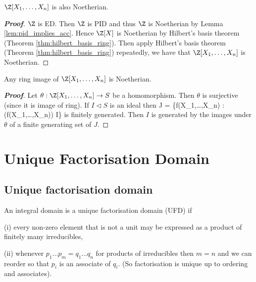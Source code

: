 \begin{corollary}
$\Z[X_1,\dots ,X_n]$ is also Noetherian.
\end{corollary}

\begin{proof}[\bf Proof]
$\Z$ is ED. Then $\Z$ is PID and thus $\Z$ is Noetherian by Lemma \ref{lem:pid_implies_acc}. Hence $\Z[X]$ is Noetherian by Hilbert's basis theorem (Theorem \ref{thm:hilbert_basis_ring}). Then apply Hilbert's basis theorem (Theorem \ref{thm:hilbert_basis_ring}) repeatedly, we have that $\Z[X_1,\dots ,X_n]$ is Noetherian.
\end{proof}

\begin{corollary}
Any ring image of $\Z[X_1,\dots ,X_n]$ is Noetherian.
\end{corollary}

\begin{proof}[\bf Proof]
Let $\theta : \Z[X_1,\dots ,X_n] \to S$ be a homomorphism. Then $\theta$ is surjective (since it is image of ring). If $I \lhd S$ is an ideal then
\be
J = \{f(X_1,\dots ,X_n) \in \Z[X_1,\dots ,X_n] : \theta(f(X_1,\dots ,X_n)) \in I\}
\ee
is finitely generated. Then $I$ is generated by the images under $\theta$ of a finite generating set of $J$.
\end{proof}


\section{Unique Factorisation Domain}

\subsection{Unique factorisation domain}

\begin{definition}\label{def:ufd_integral_domain}
An integral domain is a unique factorisation domain (UFD) if
\ben
\item [(i)] every non-zero element that is not a unit may be expressed as a product of finitely many irreducibles,
\item [(ii)] whenever $p_1 \dots p_m = q_1 \dots q_n$ for products of irreducibles then $m = n$ and we can reorder so that $p_i$ is an associate of $q_i$. (So factorisation is unique up to ordering and associates).
\een
\end{definition}


